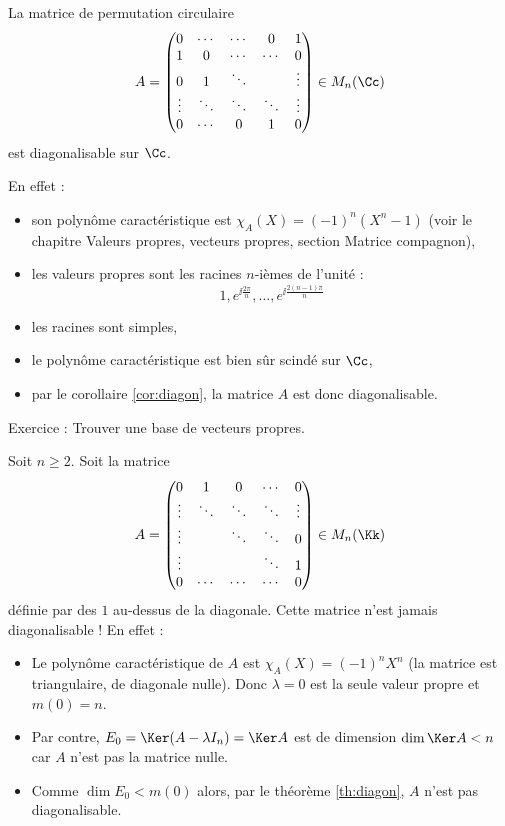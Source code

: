 \documentclass[12pt, class=report,crop=false]{standalone}
\begin{document}
\begin{exemple}
La matrice de permutation circulaire 
\[A =
\begin{pmatrix}
0&\cdots&\cdots&0&1\\
1&0&\cdots&\cdots&0\\
0&1&\ddots&&\vdots\\
\vdots&\ddots&\ddots&\ddots&\vdots\\
0&\cdots&0&1&0
\end{pmatrix}
\in M_n(\Cc)\] 
est diagonalisable sur $\Cc$.

En effet :
\begin{itemize}
  \item son polynôme caractéristique est $\chi_A(X) = (-1)^n(X^n-1)$ (voir le chapitre \og{}Valeurs propres, vecteurs propres\fg{}, section \og{}Matrice compagnon\fg{}),
  
      
  \item les valeurs propres sont les racines $n$-ièmes de l'unité :
  \[1,e^{\ii\frac{2\pi}{n}},\ldots,e^{\ii\frac{2(n-1)\pi}{n}}\]
  
  \item les racines sont simples,  
  
  \item le polynôme caractéristique est bien sûr scindé sur $\Cc$,
  
  \item par le corollaire \ref{cor:diagon}, la matrice $A$ est donc diagonalisable.
\end{itemize}

Exercice : Trouver une base de vecteurs propres.
\end{exemple}


\begin{exemple}
Soit $n \ge 2$. Soit la matrice
\[A = 
\begin{pmatrix}
0&1&0&\cdots&0\\
\vdots&\ddots&\ddots&\ddots&\vdots\\
\vdots&&\ddots&\ddots&0\\
\vdots&& &\ddots&1\\
0&\cdots&\cdots&\cdots&0
\end{pmatrix} \in M_n(\Kk)
\]
définie par des $1$ au-dessus de la diagonale.
Cette matrice n'est jamais diagonalisable !
En effet :
\begin{itemize}
  \item Le polynôme caractéristique de $A$ est $\chi_A(X) = (-1)^n X^n$ (la matrice est triangulaire, de diagonale nulle).
  Donc $\lambda = 0$ est la seule valeur propre et $m(0) = n$.
  \item Par contre, $E_0 = \Ker (A -\lambda I_n) = \Ker A$ est de dimension $\dim \Ker A < n$ car $A$ n'est pas la matrice nulle.
  \item Comme $\dim E_0 < m(0)$ alors, par le théorème \ref{th:diagon}, $A$ n'est pas diagonalisable.
\end{itemize}
\end{exemple}
\end{document}
